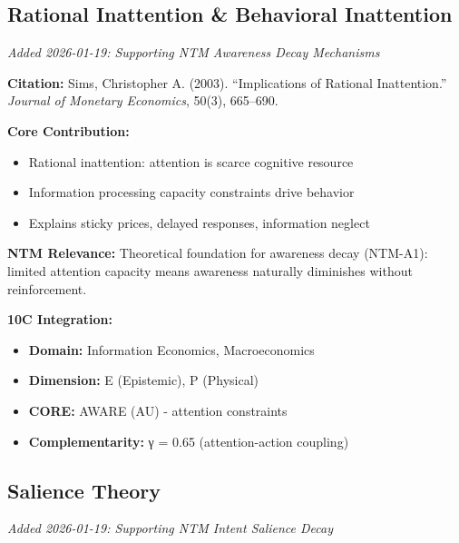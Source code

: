 \subsection{Rational Inattention \& Behavioral Inattention}
\label{subsec:ot-inattention}

\textit{Added 2026-01-19: Supporting NTM Awareness Decay Mechanisms}

\begin{tcolorbox}[colback=yellow!5!white,colframe=yellow!75!black,title=Key Paper: Sims (2003)]
\textbf{Citation:} Sims, Christopher A. (2003). ``Implications of Rational Inattention.'' \textit{Journal of Monetary Economics}, 50(3), 665--690.

\textbf{Core Contribution:}
\begin{itemize}[nosep]
    \item Rational inattention: attention is scarce cognitive resource
    \item Information processing capacity constraints drive behavior
    \item Explains sticky prices, delayed responses, information neglect
\end{itemize}

\textbf{NTM Relevance:} Theoretical foundation for awareness decay (NTM-A1): limited attention capacity means awareness naturally diminishes without reinforcement.

\textbf{10C Integration:}
\begin{itemize}[nosep]
    \item \textbf{Domain:} Information Economics, Macroeconomics
    \item \textbf{Dimension:} E (Epistemic), P (Physical)
    \item \textbf{CORE:} AWARE (AU) - attention constraints
    \item \textbf{Complementarity:} γ = 0.65 (attention-action coupling)
\end{itemize}
\end{tcolorbox}

\subsection{Salience Theory}
\label{subsec:ot-salience}

\textit{Added 2026-01-19: Supporting NTM Intent Salience Decay}

